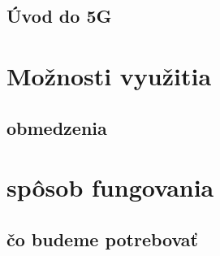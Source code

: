 \documentclass[12pt,sloak,a4paper]{article}
\begin{document}
\subsection{Úvod do 5G}



\section{Možnosti využitia} 

\subsection{obmedzenia}



\section{spôsob fungovania}

\subsection{čo budeme potrebovať }
\end{document}
